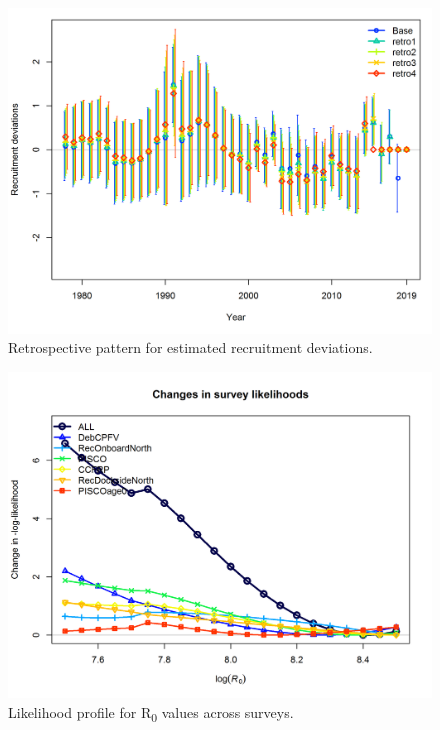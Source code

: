 \documentclass[12pt,]{article}
\begin{document}
\FloatBarrier

\begin{figure}
\centering
\includegraphics{Figures/retro_recdev.png}
\caption{Retrospective pattern for estimated recruitment deviations.
\label{fig:retro_recdev}}
\end{figure}

\FloatBarrier

\begin{figure}
\centering
\includegraphics{Figures/profile_R0_piner2.png}
\caption{Likelihood profile for R\textsubscript{0} values across
surveys. \label{fig:profile_R0_piner2}}
\end{figure}
\end{document}
